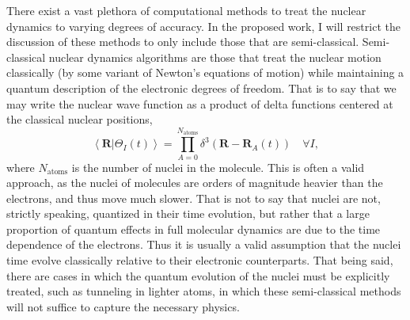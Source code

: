 \documentclass[12pt]{article}
\newcommand{\inner}[2]{\left\langle #1 \left\vert\right. #2 \right\rangle}            %
\newcommand*\vc[1]{\boldsymbol{#1}}
\begin{document}
There exist a vast plethora of computational methods to treat the nuclear
dynamics to varying degrees of accuracy. In the proposed work, I will restrict
the discussion of these methods to only include those that are semi-classical.
Semi-classical nuclear dynamics algorithms are those that treat the nuclear
motion classically (by some variant of Newton's equations of motion) while
maintaining a quantum description of the electronic degrees of freedom. That is
to say that we may write the nuclear wave function as a product of delta
functions centered at the classical nuclear positions,
\begin{equation}
\inner{\vc{R}}{\Theta_I (t)} = 
  \prod_{A = 0}^{N_\mathrm{atoms}} \delta^3(\vc{R} - \vc{R}_A(t))
  \quad \forall I,
  \label{eq:ClassicalNuclei}
\end{equation}
where $N_\mathrm{atoms}$ is the number of nuclei in the molecule.  This is
often a valid approach, as the nuclei of molecules are orders of magnitude
heavier than the electrons, and thus move much slower. That is not to say that
nuclei are not, strictly speaking, quantized in their time evolution, but
rather that a large proportion of quantum effects in full molecular dynamics
are due to the time dependence of the electrons. Thus it is usually a valid
assumption that the nuclei time evolve classically relative to their electronic
counterparts. That being said, there are cases in which the quantum evolution
of the nuclei must be explicitly treated, such as tunneling in lighter atoms,
in which these semi-classical methods will not suffice to capture the necessary
physics.
\end{document}
